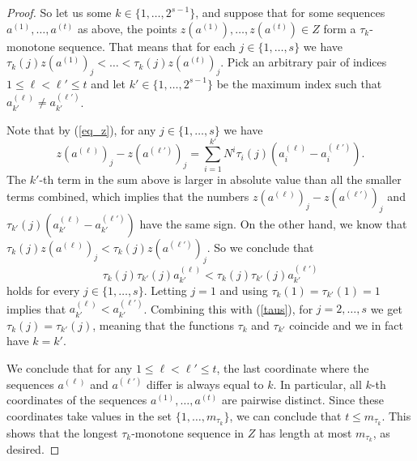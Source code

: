 \documentclass[11pt]{article}
\theoremstyle{definition}
\numberwithin{equation}{section}
\numberwithin{figure}{section}
\begin{document}
\begin{proof}
So let us some $k \in \{1, \ldots, 2^{s-1}\}$, and suppose that for some sequences $a^{(1)}, \ldots, a^{(t)}$ as above, the points $z(a^{(1)}), \ldots, z(a^{(t)}) \in Z$ form a $\tau_k$-monotone sequence. That means that for each $j \in \{1, \ldots, s\}$ we have $\tau_k(j) z(a^{(1)})_j<\dots<\tau_k(j) z(a^{(t)})_j$. 
Pick an arbitrary pair of indices $1\le \ell < \ell' \le t$ and let $k' \in \{1, \ldots, 2^{s-1}\}$ be the maximum index such that $a^{(\ell)}_{k'} \neq a^{(\ell')}_{k'}$.

Note that by (\ref{eq_z}), for any $j\in \{1, \ldots, s\}$ we have 
$$
z(a^{(\ell)})_j - z(a^{(\ell')})_j = \sum_{i=1}^{k'} N^i \tau_i(j) (a^{(\ell)}_i - a^{(\ell')}_i).
$$
The $k'$-th term in the sum above is larger in absolute value than all the smaller terms combined, which implies that the numbers $z(a^{(\ell)})_j - z(a^{(\ell')})_j$ and $\tau_{k'}(j)(a^{(\ell)}_{k'} - a^{(\ell')}_{k'})$ have the same sign. On the other hand, we know that $\tau_k(j) z(a^{(\ell)})_j < \tau_k(j) z(a^{(\ell')})_j$. So we conclude that 
\begin{equation}\label{taus}
\tau_{k}(j) \tau_{k'}(j) a^{(\ell)}_{k'} < \tau_{k}(j) \tau_{k'}(j) a^{(\ell')}_{k'}    
\end{equation}
holds for every $j \in \{1, \ldots, s\}$. Letting $j = 1$ and using $\tau_k(1) = \tau_{k'}(1)=1$ implies that $a^{(\ell)}_{k'} < a^{(\ell')}_{k'}$. Combining this with (\ref{taus}), for $j=2,\dots,s$ we get $\tau_k(j) = \tau_{k'}(j)$, meaning that the functions $\tau_k$ and $\tau_{k'}$ coincide and we in fact have $k = k'$.

We conclude that for any $1\le \ell<\ell' \le t$, the last coordinate where the sequences $a^{(\ell)}$ and $a^{(\ell')}$ differ is always equal to $k$. In particular, all $k$-th coordinates of the sequences $a^{(1)}, \ldots, a^{(t)}$ are pairwise distinct. Since these coordinates take values in the set $\{1, \ldots, m_{\tau_k}\}$, we can conclude that $t \le m_{\tau_k}$. This shows that the longest $\tau_k$-monotone sequence in $Z$ has length at most $m_{\tau_k}$, as desired.
\end{proof}
\end{document}
